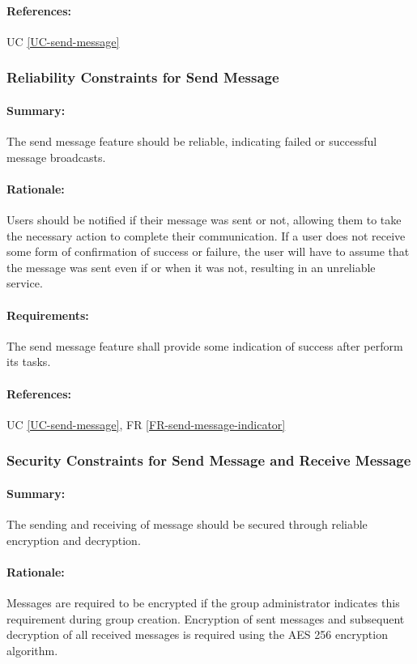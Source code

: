 \documentclass[11pt]{article}
\begin{document}
\paragraph{References:} UC \ref{UC-send-message}

\subsubsection{Reliability Constraints for Send Message} \label{NFR-reliability-send-message}
\paragraph{Summary:} The send message feature should be reliable, indicating failed or successful message broadcasts.
\paragraph{Rationale:} Users should be notified if their message was sent or not, allowing them to take the necessary action to complete their communication. If a user does not receive some form of confirmation of success or failure, the user will have to assume that the message was sent even if or when it was not, resulting in an unreliable service.
\paragraph{Requirements:} The send message feature shall provide some indication of success after perform its tasks.
\paragraph{References:} UC \ref{UC-send-message}, FR \ref{FR-send-message-indicator}

\subsubsection{Security Constraints for Send Message and Receive Message} \label{NFR-security-send-message-and-receive-message}
\paragraph{Summary:} The sending and receiving of message should be secured through reliable encryption and decryption.
\paragraph{Rationale:} Messages are required to be encrypted if the group administrator indicates this requirement during group creation. Encryption of sent messages and subsequent decryption of all received messages is required using the AES 256 encryption algorithm. 
\end{document}
